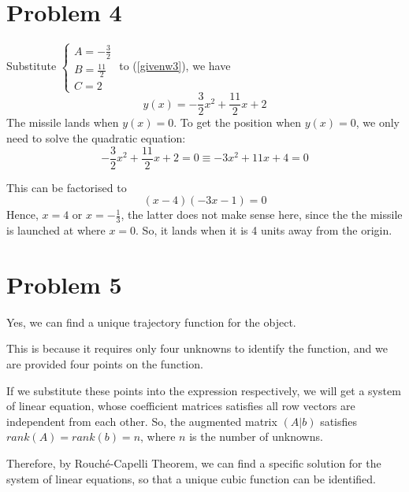 \documentclass[12pt,a4paper]{article}
\begin{document}
\section*{Problem 4}
Substitute 
$\begin{cases}
    A = -\frac{3}{2}\\
    B =  \frac{11}{2}\\
    C = 2
\end{cases}$
to (\ref{givenw3}), we have 
\[
y(x) = -\frac{3}{2}x^2 + \frac{11}{2}x + 2
\]
The missile lands when $y(x) = 0$. To get the position when $y(x) = 0$, we only need to solve the quadratic equation:
\[
-\frac{3}{2}x^2 + \frac{11}{2}x + 2 = 0 \equiv -3x^2 + 11x + 4 = 0
\]

This can be factorised to
\[
(x-4)(-3 x-1)=0
\]
Hence, $x = 4$ or $x = -\frac{1}{3}$, the latter does not make sense here, since the the missile is launched at where $x = 0$.
So, it lands when it is 4 units away from the origin.






\section*{Problem 5}
\begin{solution}
Yes, we can find a unique trajectory function for the object. 

This is because it requires only four unknowns to identify the function, and we are provided four points on the function. 

If we substitute these points into the expression respectively, we will get a system of linear equation, whose coefficient matrices satisfies all row vectors are independent from each other. So, the augmented matrix $(A|b)$ satisfies $rank(A)=rank(b) = n$, where $n$ is the number of unknowns.

Therefore, by Rouché-Capelli Theorem, we can find a specific solution for the system of linear equations, so that a unique cubic function can be identified.
\end{solution}
\end{document}
